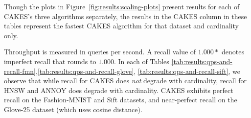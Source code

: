 Though the plots in Figure~\ref{fig:results:scaling-plots} present results for each of CAKES's three algorithms separately, the results in the CAKES column in these tables represent the fastest CAKES algorithm for that dataset and cardinality only.

Throughput is measured in queries per second.
A recall value of $1.000*$ denotes imperfect recall that rounds to $1.000$.
In each of Tables \ref{tab:results:qps-and-recall-fmn},\ref{tab:results:qps-and-recall-glove}, \ref{tab:results:qps-and-recall-sift}, we observe that while recall for CAKES does \emph{not} degrade with cardinality, recall for
HNSW and ANNOY does degrade with cardinality. CAKES exhibits perfect recall on the Fashion-MNIST and Sift datasets, and near-perfect recall on the Glove-25 dataset (which uses cosine distance).








